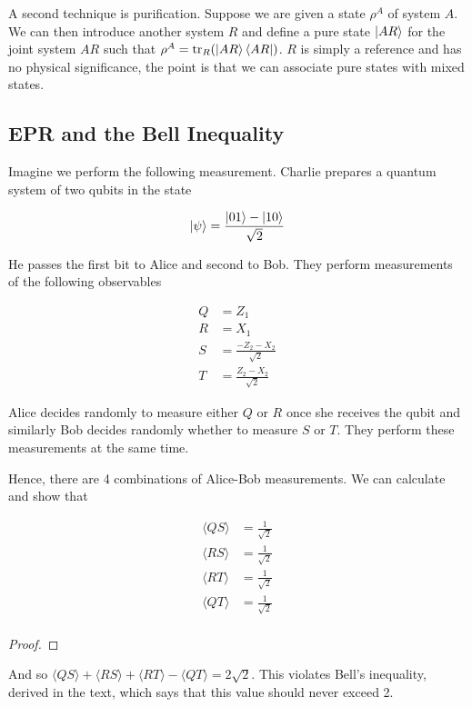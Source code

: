 \documentclass[11pt]{article}
\newcommand\0{\mathbf{0}}
\newcommand\<{\langle}
\renewcommand\>{\rangle}
\begin{document}
A second technique is purification. Suppose we are given a state $\rho^A$ of system $A$. We can then introduce another system $R$ and define a pure state $\ket{AR}$ for the joint system $AR$ such that $\rho^A = \tr_R (\ket{AR}\bra{AR})$. $R$ is simply a reference and has no physical significance, the point is that we can associate pure states with mixed states.
\subsection{EPR and the Bell Inequality}  

Imagine we perform the following measurement. Charlie prepares a quantum system of two qubits in the state

\begin{align*}
\ket{\psi} = \frac{\ket{01} - \ket{10}}{\sqrt{2}}	
\end{align*}

He passes the first bit to Alice and second to Bob. They perform measurements of the following observables

\begin{align*}
Q &= Z_1 \\
R &= X_1 \\
S &= \frac{-Z_2-X_2}{\sqrt{2}} \\
T &= \frac{Z_2 - X_2}{\sqrt{2}}	
\end{align*}

Alice decides randomly to measure either $Q$ or $R$ once she receives the qubit and similarly Bob decides randomly whether to measure $S$ or $T$. They perform these measurements at the same time.

Hence, there are 4 combinations of Alice-Bob measurements. We can calculate and show that 

\begin{align*}
\langle QS \rangle &= \frac{1}{\sqrt{2}}\\	
\langle RS \rangle &= \frac{1}{\sqrt{2}}\\	
\langle RT \rangle &= \frac{1}{\sqrt{2}}\\	
\langle QT \rangle &= \frac{1}{\sqrt{2}}\\	
\end{align*}

\begin{proof}
\end{proof}

And so $\langle QS \rangle + \langle RS \rangle + \langle RT \rangle - \langle QT \rangle = 2\sqrt{2}$. This violates Bell's inequality, derived in the text, which says that this value should never exceed 2. 
\end{document}
